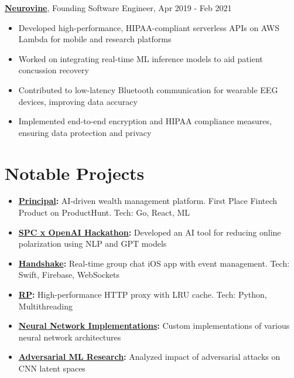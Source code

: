 \documentclass[9pt]{article}
\begin{document}
\noindent
\textbf{\href{https://neurovine.ai}{Neurovine}}, Founding Software Engineer, Apr 2019 - Feb 2021
\begin{itemize}
    \setlength\itemsep{0em}
    \item Developed high-performance, HIPAA-compliant serverless APIs on AWS Lambda for mobile and research platforms
    \item Worked on integrating real-time ML inference models to aid patient concussion recovery
    \item Contributed to low-latency Bluetooth communication for wearable EEG devices, improving data accuracy
    \item Implemented end-to-end encryption and HIPAA compliance measures, ensuring data protection and privacy
\end{itemize}

\section*{Notable Projects}

\begin{itemize}
    \setlength\itemsep{0em}
    \item \textbf{\href{https://withprincipal.com}{Principal}:} AI-driven wealth management platform. First Place Fintech Product on ProductHunt. Tech: Go, React, ML
    \item \textbf{\href{https://x.com/tomas_hk/status/1764725667130991022}{SPC x OpenAI Hackathon}:} Developed an AI tool for reducing online polarization using NLP and GPT models
    \item \textbf{\href{https://github.com/boshd/handshake}{Handshake}:} Real-time group chat iOS app with event management. Tech: Swift, Firebase, WebSockets
    \item \textbf{\href{https://github.com/boshd/rp}{RP}:} High-performance HTTP proxy with LRU cache. Tech: Python, Multithreading
    \item \textbf{\href{https://github.com/boshd/neuralnets}{Neural Network Implementations}:} Custom implementations of various neural network architectures
    \item \textbf{\href{https://github.com/boshd/advatck}{Adversarial ML Research}:} Analyzed impact of adversarial attacks on CNN latent spaces
\end{itemize}
\end{document}
